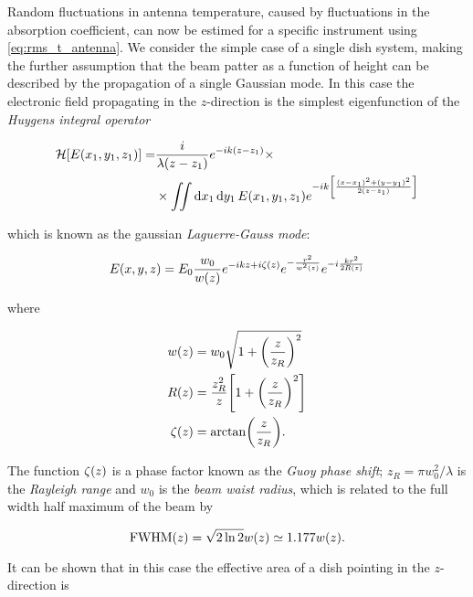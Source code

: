 Random fluctuations in antenna temperature, caused by fluctuations in the
absorption coefficient, can now be estimed for a specific instrument using
\autoref{eq:rms_t_antenna}. We consider the simple case of a single dish
system, making the further assumption that the beam patter as a function of
height can be described by the propagation of a single Gaussian mode.
In this case the electronic field propagating in the $z$-direction is the
simplest eigenfunction of the \emph{Huygens integral operator}

\begin{equation}
        \begin{split}
                \mathcal{H}\qty[E\qty(x_1,y_1,z_1)] = &
                \frac{i}{\lambda \qty(z - z_1)} e^{-ik\qty(z - z_1)} \times \\
                & \times \iint \dd{x_1}\dd{y_1} E\qty(x_1,y_1,z_1)
                e^{-ik\qty[\frac{\qty(x - x_1)^2 +
                \qty(y - y_1) ^2}{2\qty(z - z_1)}]}
        \end{split}
\end{equation}

which is known as the gaussian \emph{Laguerre-Gauss mode}:

\begin{equation}
        E\qty(x,y,z) = E_0 \frac{w_0}{w\qty(z)} e^{-ikz + i\zeta\qty(z)}
        e^{-\frac{r^2}{w^2\qty(z)}} e^{-i\frac{kr^2}{2R\qty(z)}}
\end{equation}

where

\begin{align}
        w\qty(z) & = w_0 \sqrt{1 + \qty(\frac{z}{z_R})^2} \\
        R\qty(z) & = \frac{z^2_R}{z}\qty[1 + \qty(\frac{z}{z_R})^2] \\
        \zeta\qty(z) & = \arctan(\frac{z}{z_R}).
\end{align}

The function $\zeta\qty(z)$ is a phase factor known as the \emph{Guoy phase
shift}; $z_R = \pi w_0^2/\lambda$ is the \emph{Rayleigh range} and $w_0$ is
the \emph{beam waist radius}, which is related to the full width half
maximum of the beam by

\begin{equation}
        \text{FWHM}\qty(z) = \sqrt{2\ln 2} w\qty(z) \simeq 1.177 w\qty(z).
\end{equation}

It can be shown that in this case the effective area of a dish pointing in
the $z$-direction is

